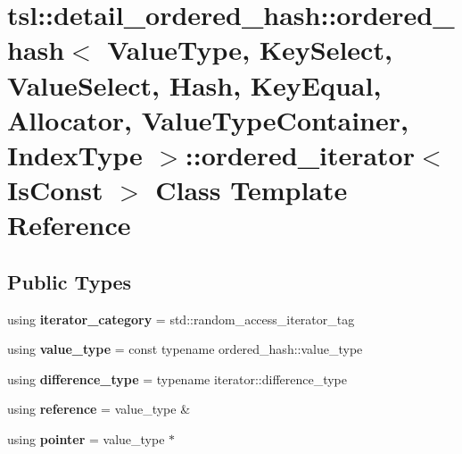 \hypertarget{classtsl_1_1detail__ordered__hash_1_1ordered__hash_1_1ordered__iterator}{}\section{tsl\+::detail\+\_\+ordered\+\_\+hash\+::ordered\+\_\+hash$<$ Value\+Type, Key\+Select, Value\+Select, Hash, Key\+Equal, Allocator, Value\+Type\+Container, Index\+Type $>$\+::ordered\+\_\+iterator$<$ Is\+Const $>$ Class Template Reference}
\label{classtsl_1_1detail__ordered__hash_1_1ordered__hash_1_1ordered__iterator}
\subsection*{Public Types}
\begin{DoxyCompactItemize}
\item 
\mbox{\label{classtsl_1_1detail__ordered__hash_1_1ordered__hash_1_1ordered__iterator_ad0a817884c60c84b71423738f3b3079e}} 
using {\bfseries iterator\+\_\+category} = std\+::random\+\_\+access\+\_\+iterator\+\_\+tag
\item 
\mbox{\label{classtsl_1_1detail__ordered__hash_1_1ordered__hash_1_1ordered__iterator_aabe5439920b6424f25fac09c355935c2}} 
using {\bfseries value\+\_\+type} = const typename ordered\+\_\+hash\+::value\+\_\+type
\item 
\mbox{\label{classtsl_1_1detail__ordered__hash_1_1ordered__hash_1_1ordered__iterator_a12229dff959dabc3becab2d54f78b7db}} 
using {\bfseries difference\+\_\+type} = typename iterator\+::difference\+\_\+type
\item 
\mbox{\label{classtsl_1_1detail__ordered__hash_1_1ordered__hash_1_1ordered__iterator_aa4b8a3fc4f047b4d4b4b767acbf890b9}} 
using {\bfseries reference} = value\+\_\+type \&
\item 
\mbox{\label{classtsl_1_1detail__ordered__hash_1_1ordered__hash_1_1ordered__iterator_a50ddad181cf28f19f8e65ce201722f0d}} 
using {\bfseries pointer} = value\+\_\+type $\ast$
\end{DoxyCompactItemize}
